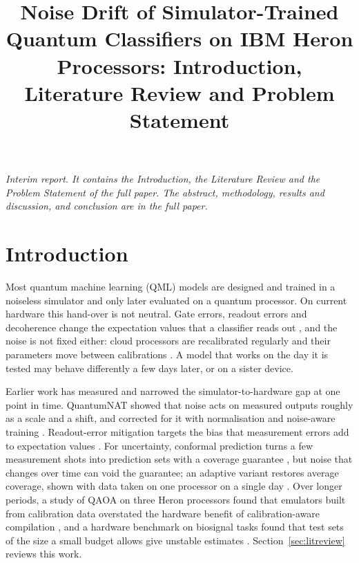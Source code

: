 \documentclass[10pt,conference]{IEEEtran}
\begin{document}
\title{Noise Drift of Simulator-Trained Quantum Classifiers on IBM Heron Processors:
Introduction, Literature Review and Problem Statement}

\author{
}

\maketitle

\noindent\textit{Interim report. It contains the Introduction, the Literature Review and the
Problem Statement of the full paper. The abstract, methodology, results and discussion, and
conclusion are in the full paper.}

\section{Introduction}
\label{sec:intro}

Most quantum machine learning (QML) models are designed and trained in a noiseless simulator
and only later evaluated on a quantum processor. On current hardware this hand-over is not
neutral. Gate errors, readout errors and decoherence change the expectation values that a
classifier reads out \cite{wang2021nibp,heyraud2022noisykernels}, and the noise is not fixed
either: cloud processors are recalibrated regularly and their parameters move between
calibrations \cite{realtimecal2023}. A model that works on the day it is tested may behave
differently a few days later, or on a sister device.

Earlier work has measured and narrowed the simulator-to-hardware gap at one point in time.
QuantumNAT showed that noise acts on measured outputs roughly as a scale and a shift, and
corrected for it with normalisation and noise-aware training \cite{wang2022quantumnat}.
Readout-error mitigation targets the bias that measurement errors add to expectation values
\cite{nation2021m3,vandenberg2022trex}. For uncertainty, conformal prediction turns a few
measurement shots into prediction sets with a coverage guarantee \cite{park2023qcp}, but noise
that changes over time can void the guarantee; an adaptive variant restores average coverage,
shown with data taken on one processor on a single day \cite{spencer2026aqcp}. Over longer
periods, a study of QAOA on three Heron processors found that emulators built from calibration
data overstated the hardware benefit of calibration-aware compilation \cite{qaoa2026drift}, and
a hardware benchmark on biosignal tasks found that test sets of the size a small budget allows
give unstable estimates \cite{qbiobench2026}. Section~\ref{sec:litreview} reviews this work.
\end{document}
